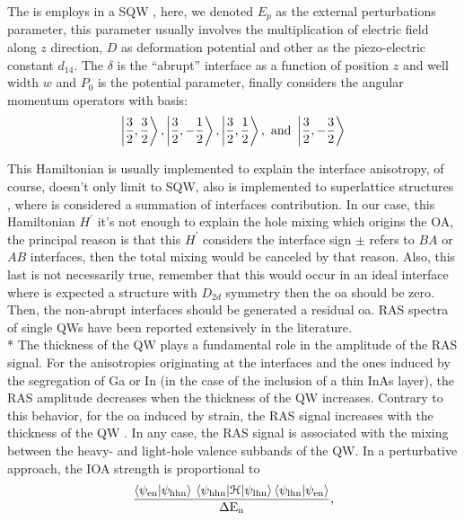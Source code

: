 The  is employs in a \gls{SQW} \cite{chen2002interface}, here, we denoted $E_{p}$ as the external perturbations parameter, this parameter usually involves the multiplication of electric field along $z$ direction, $D$ as deformation potential and other as the piezo-electric constant $d_{14}$. The $\delta$  is the ``abrupt'' interface as a function of position $z$ and well width $w$ and $P_{0}$ is the potential parameter, finally considers the angular momentum operators with basis\cite{chen2002interface}:  
\begin{equation}\label{eqn:chapter-2-sec-anisotropy-model-jotas-basis}
	\ket{\dfrac{3}{2},\dfrac{3}{2}},\ket{\dfrac{3}{2},-\dfrac{1}{2}},\ket{\dfrac{3}{2},\dfrac{1}{2}},\text{ and } \ket{\dfrac{3}{2},-\dfrac{3}{2}}
\end{equation}

This Hamiltonian is usually implemented to explain the interface anisotropy, of course, doesn't only limit to \gls{SQW}, also is implemented to superlattice structures \cite{ye2001inplane}, where is considered a summation of interfaces contribution.  In our case, this Hamiltonian $H^{\prime}$ it's not enough to explain the hole mixing which origins the OA, the principal reason is that this  $H^{\prime}$ considers the interface sign $\pm$ refers to $BA$ or $AB$ interfaces, then the total mixing would be canceled by that reason. Also, this last is not necessarily true, remember that this would occur in an ideal interface where is expected a structure with $D_{2d}$ symmetry then the \gls{oa} should be zero. Then, the non-abrupt interfaces should be generated a residual \gls{oa}\cite{li2019quantitative,krebs1998inversion,chen2002interface}. \gls{RAS} spectra of single QWs have been reported extensively in the literature\cite{chen2002interface,koopmans1998microscopic,tang2009well-width,li2019quantitative,yu2015tuning}. \\*
The thickness of the \gls{QW} plays a fundamental role in the amplitude of the \gls{RAS} signal. For the anisotropies originating at the interfaces and the ones induced by the segregation of Ga or In (in the case of the inclusion of a thin InAs layer), the \gls{RAS} amplitude decreases when the thickness of the \gls{QW}
increases\cite{chen2002interface}. Contrary to this behavior, for the \gls{oa} induced by strain, the \gls{RAS} signal increases with the thickness of the
\gls{QW} \cite{tang2009well-width}. In any case, the \gls{RAS} signal is associated with the mixing between the heavy- and light-hole valence subbands
of the \gls{QW}\cite{ivchenko1996heavylight}. In a perturbative approach, the IOA strength is proportional to
\begin{equation}\label{eqn:chapter-2-sec-anisotropy-model-perturbative}
	\dfrac{
		   \braket{\psi_{\mathrm{en}}} {\psi_{\mathrm{hhn}}}
		   \mel{\psi_{\mathrm{hhn}}}{\cal{H}}{\psi_{\mathrm{lhn}}}
		   \braket{\psi_{\mathrm{lhn}}} {\psi_{\mathrm{en}}}
		  }
		  {\mathrm{\Delta E_{n}}
		  },
\end{equation}

